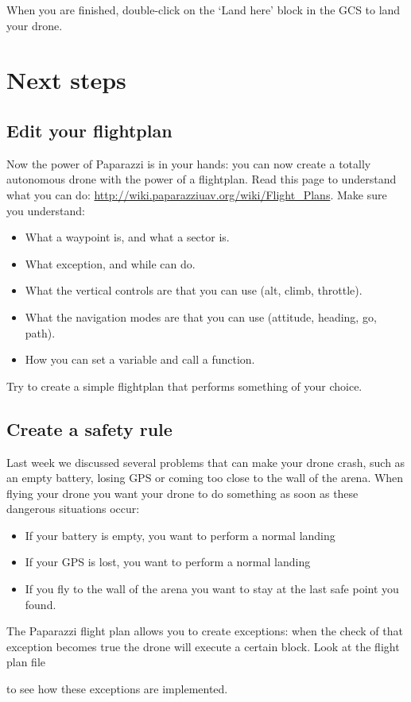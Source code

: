 When you are finished, double-click on the `Land here' block in the GCS to land your drone.

\section{Next steps}
\subsection*{Edit your flightplan}
Now the power of Paparazzi is in your hands: you can now create a totally autonomous drone with the power of a flightplan. Read this page to understand what you can do: \url{http://wiki.paparazziuav.org/wiki/Flight_Plans}. 
Make sure you understand:
\begin{itemize}
	\item What a waypoint is, and what a sector is. 
	\item What exception, and while can do. 
	\item What the vertical controls are that you can use (alt, climb, throttle).
	\item What the navigation modes are that you can use (attitude, heading, go, path). 
	\item How you can set a variable and call a function. 
\end{itemize}

Try to create a simple flightplan that performs something of your choice. 

\subsection*{Create a safety rule}
Last week we discussed several problems that can make your drone crash, such as an empty battery, losing GPS or coming too close to the wall of the arena.
When flying your drone you want your drone to do something as soon as these dangerous situations occur:
\begin{itemize}
	\item If your battery is empty, you want to perform a normal landing
	\item If your GPS is lost, you want to perform a normal landing
	\item If you fly to the wall of the arena you want to stay at the last safe point you found. 
\end{itemize}
The Paparazzi flight plan allows you to create exceptions: when the check of that exception becomes true the drone will execute a certain block. Look at the flight plan file 

 to see how these exceptions are implemented. 

